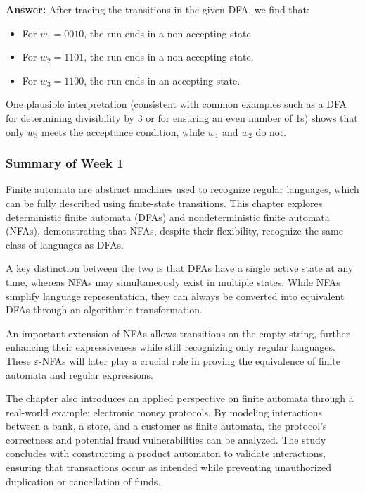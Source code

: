 \documentclass{article}
\theoremstyle{theorem}
\theoremstyle{definition}
\theoremstyle{remark}
\begin{document}
\newpage

\textbf{Answer:} After tracing the transitions in the given DFA, we find that:
\begin{itemize}
    \item For \(w_1 = 0010\), the run ends in a non-accepting state.
    \item For \(w_2 = 1101\), the run ends in a non-accepting state.
    \item For \(w_3 = 1100\), the run ends in an accepting state.
\end{itemize}

One plausible interpretation (consistent with common examples such as a DFA for determining divisibility by 3 or for ensuring an even number of 1s) shows that only \(w_3\) meets the acceptance condition, while \(w_1\) and \(w_2\) do not.

\subsubsection*{Summary of Week 1}

Finite automata are abstract machines used to recognize regular languages, which can be fully described using finite-state transitions. This chapter explores deterministic finite automata (DFAs) and nondeterministic finite automata (NFAs), demonstrating that NFAs, despite their flexibility, recognize the same class of languages as DFAs.

A key distinction between the two is that DFAs have a single active state at any time, whereas NFAs may simultaneously exist in multiple states. While NFAs simplify language representation, they can always be converted into equivalent DFAs through an algorithmic transformation.

An important extension of NFAs allows transitions on the empty string, further enhancing their expressiveness while still recognizing only regular languages. These \(\varepsilon\)-NFAs will later play a crucial role in proving the equivalence of finite automata and regular expressions.

The chapter also introduces an applied perspective on finite automata through a real-world example: electronic money protocols. By modeling interactions between a bank, a store, and a customer as finite automata, the protocol’s correctness and potential fraud vulnerabilities can be analyzed. The study concludes with constructing a product automaton to validate interactions, ensuring that transactions occur as intended while preventing unauthorized duplication or cancellation of funds.
\end{document}
